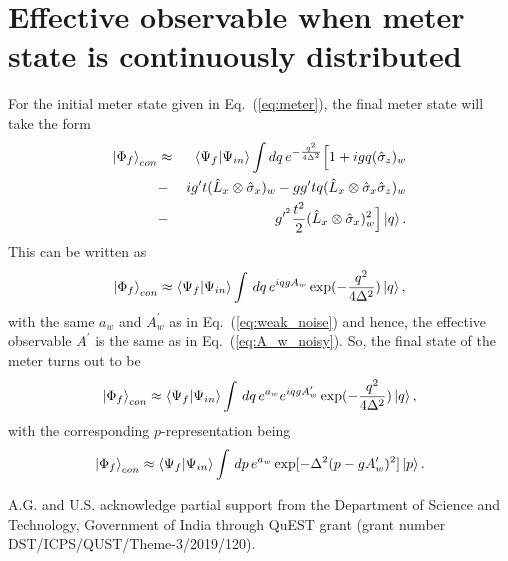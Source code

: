 \documentclass[aps,pra,showpacs,twoside,twocolumn,10pt]{revtex4-1}
\begin{document}
\section{Effective observable when meter state is continuously distributed}
\label{discrete}
For the initial meter state given in Eq.~(\ref{eq:meter}), the final meter state will take the form
\begin{eqnarray}
  \ket{\Phi_f}_{con}  &\approx&  \braket{\Psi_f|\Psi_{in}}\int dq \, e^{-\frac{q^2}{4\Delta^2}}\Big[1+i g q(\hat{\sigma}_z)_w\nonumber\\ 
  &-& i g^{\prime} t (\hat{L}_x\otimes \hat{\sigma}_x)_w-gg^\prime tq (\hat{L}_x\otimes \hat{\sigma}_x \hat{\sigma}_z)_w \nonumber\\
  &-& g^{\prime^2}\frac{t^2}{2}(\hat{L}_x\otimes \hat{\sigma}_x)_w^2\Big]\ket{q}. 
  \end{eqnarray}
  This can be written as
\begin{equation}
 \ket{\Phi_f}_{con} \approx \braket{\Psi_f|\Psi_{in}}\int \,dq\, e^{iqgA_w}\exp(-\frac{q^2}{4\Delta^2})\ket{q},
  \end{equation}
  with the same $a_w$ and $A^{\prime}_w$ as in Eq.~(\ref{eq:weak_noise}) and hence, the effective observable $A^{\prime}$ is the same as in Eq.~(\ref{eq:A_w_noisy}).
So, the final state of the meter turns out to be
\begin{equation}
 \ket{\Phi_f}_{con} \approx \braket{\Psi_f|\Psi_{in}}\int \,dq\,e^{a_w} e^{iqgA^{\prime}_w}\exp(-\frac{q^2}{4\Delta^2})\ket{q},
\end{equation}
with the corresponding $p$-representation being
\begin{equation}
 \ket{\Phi_f}_{con} \approx \braket{\Psi_f|\Psi_{in}}\int \,dp\,e^{a_w} \exp[-\Delta^2(p-gA^{\prime}_w)^2]\ket{p}.
\end{equation}



\acknowledgements
A.G. and U.S. acknowledge partial support from the Department of Science and Technology, Government of India through QuEST grant (grant number DST/ICPS/QUST/Theme-3/2019/120). 
\end{document}
